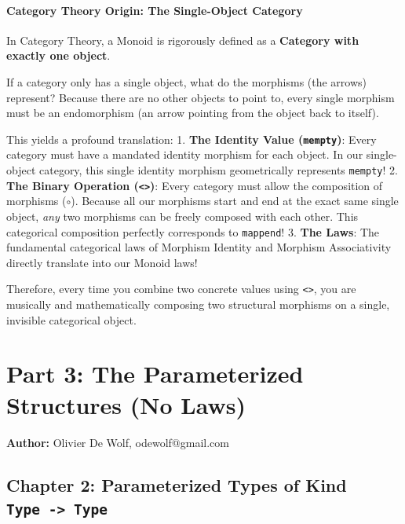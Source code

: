 \documentclass[
]{article}
\begin{document}
\paragraph{Category Theory Origin: The Single-Object
Category}\label{category-theory-origin-the-single-object-category}

In Category Theory, a Monoid is rigorously defined as a \textbf{Category
with exactly one object}.

If a category only has a single object, what do the morphisms (the
arrows) represent? Because there are no other objects to point to, every
single morphism must be an endomorphism (an arrow pointing from the
object back to itself).

This yields a profound translation: 1. \textbf{The Identity Value
(\texttt{mempty})}: Every category must have a mandated identity
morphism for each object. In our single-object category, this single
identity morphism geometrically represents \texttt{mempty}! 2.
\textbf{The Binary Operation (\texttt{\textless{}\textgreater{}})}:
Every category must allow the composition of morphisms (\(\circ\)).
Because all our morphisms start and end at the exact same single object,
\emph{any} two morphisms can be freely composed with each other. This
categorical composition perfectly corresponds to \texttt{mappend}! 3.
\textbf{The Laws}: The fundamental categorical laws of Morphism Identity
and Morphism Associativity directly translate into our Monoid laws!

Therefore, every time you combine two concrete values using
\texttt{\textless{}\textgreater{}}, you are musically and mathematically
composing two structural morphisms on a single, invisible categorical
object.

\section{Part 3: The Parameterized Structures (No
Laws)}\label{part-3-the-parameterized-structures-no-laws}

\textbf{Author:} Olivier De Wolf, odewolf@gmail.com

\subsection{\texorpdfstring{Chapter 2: Parameterized Types of Kind
\texttt{Type\ -\textgreater{}\ Type}}{Chapter 2: Parameterized Types of Kind Type -\textgreater{} Type}}\label{chapter-2-parameterized-types-of-kind-type---type}
\end{document}

